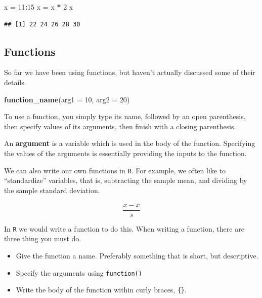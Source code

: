 \documentclass[]{book}
\newenvironment{Shaded}{\begin{snugshade}}{\end{snugshade}}
\newcommand{\KeywordTok}[1]{\textcolor[rgb]{0.13,0.29,0.53}{\textbf{#1}}}
\newcommand{\DataTypeTok}[1]{\textcolor[rgb]{0.13,0.29,0.53}{#1}}
\newcommand{\DecValTok}[1]{\textcolor[rgb]{0.00,0.00,0.81}{#1}}
\newcommand{\StringTok}[1]{\textcolor[rgb]{0.31,0.60,0.02}{#1}}
\newcommand{\OperatorTok}[1]{\textcolor[rgb]{0.81,0.36,0.00}{\textbf{#1}}}
\newcommand{\NormalTok}[1]{#1}
\providecommand{\tightlist}{%
  \setlength{\itemsep}{0pt}\setlength{\parskip}{0pt}}
\theoremstyle{definition}
\theoremstyle{definition}
\theoremstyle{definition}
\theoremstyle{remark}
\begin{document}
\begin{Shaded}
\begin{Highlighting}[]
\NormalTok{x =}\StringTok{ }\DecValTok{11}\OperatorTok{:}\DecValTok{15}
\NormalTok{x =}\StringTok{ }\NormalTok{x }\OperatorTok{*}\StringTok{ }\DecValTok{2}
\NormalTok{x}
\end{Highlighting}
\end{Shaded}

\begin{verbatim}
## [1] 22 24 26 28 30
\end{verbatim}

\subsection{Functions}\label{functions}

So far we have been using functions, but haven't actually discussed some
of their details.

\begin{Shaded}
\begin{Highlighting}[]
\KeywordTok{function_name}\NormalTok{(}\DataTypeTok{arg1 =} \DecValTok{10}\NormalTok{, }\DataTypeTok{arg2 =} \DecValTok{20}\NormalTok{)}
\end{Highlighting}
\end{Shaded}

To use a function, you simply type its name, followed by an open
parenthesis, then specify values of its arguments, then finish with a
closing parenthesis.

An \textbf{argument} is a variable which is used in the body of the
function. Specifying the values of the arguments is essentially
providing the inputs to the function.

We can also write our own functions in \texttt{R}. For example, we often
like to ``standardize'' variables, that is, subtracting the sample mean,
and dividing by the sample standard deviation.

\[
\frac{x - \bar{x}}{s}
\]

In \texttt{R} we would write a function to do this. When writing a
function, there are three thing you must do.

\begin{itemize}
\tightlist
\item
  Give the function a name. Preferably something that is short, but
  descriptive.
\item
  Specify the arguments using \texttt{function()}
\item
  Write the body of the function within curly braces, \texttt{\{\}}.
\end{itemize}
\end{document}
